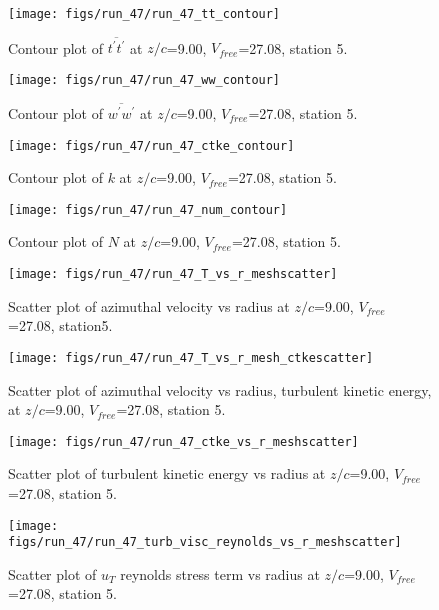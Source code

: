 \begin{figure}[H]
\centering
\texttt{[image: figs/run\_47/run\_47\_tt\_contour]}
\caption{Contour plot of $\overline{t^\prime t^\prime}$ at $z/c$=9.00, $V_{free}$=27.08, station 5.}
\end{figure}


\begin{figure}[H]
\centering
\texttt{[image: figs/run\_47/run\_47\_ww\_contour]}
\caption{Contour plot of $\overline{w^\prime w^\prime}$ at $z/c$=9.00, $V_{free}$=27.08, station 5.}
\end{figure}


\begin{figure}[H]
\centering
\texttt{[image: figs/run\_47/run\_47\_ctke\_contour]}
\caption{Contour plot of $k$ at $z/c$=9.00, $V_{free}$=27.08, station 5.}
\end{figure}


\begin{figure}[H]
\centering
\texttt{[image: figs/run\_47/run\_47\_num\_contour]}
\caption{Contour plot of $N$ at $z/c$=9.00, $V_{free}$=27.08, station 5.}
\end{figure}


\begin{figure}[H]
\centering
\texttt{[image: figs/run\_47/run\_47\_T\_vs\_r\_meshscatter]}
\caption{Scatter plot of azimuthal velocity vs radius at $z/c$=9.00, $V_{free}$=27.08, station5.}
\end{figure}


\begin{figure}[H]
\centering
\texttt{[image: figs/run\_47/run\_47\_T\_vs\_r\_mesh\_ctkescatter]}
\caption{Scatter plot of azimuthal velocity vs radius, turbulent kinetic energy, at $z/c$=9.00, $V_{free}$=27.08, station 5.}
\end{figure}


\begin{figure}[H]
\centering
\texttt{[image: figs/run\_47/run\_47\_ctke\_vs\_r\_meshscatter]}
\caption{Scatter plot of turbulent kinetic energy vs radius at $z/c$=9.00, $V_{free}$=27.08, station 5.}
\end{figure}


\begin{figure}[H]
\centering
\texttt{[image: figs/run\_47/run\_47\_turb\_visc\_reynolds\_vs\_r\_meshscatter]}
\caption{Scatter plot of $
u_T$ reynolds stress term vs radius at $z/c$=9.00, $V_{free}$=27.08, station 5.}
\end{figure}


